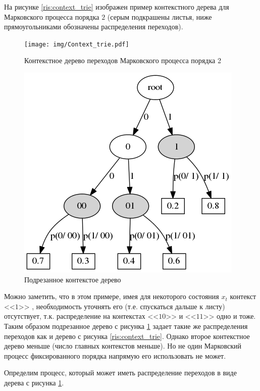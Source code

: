 \documentclass{matmex-diploma-custom}
\begin{document}
На рисунке \ref{ris:context_trie} изображен пример контекстного дерева для Марковского процесса порядка $ 2 $ (серым подкрашены листья, ниже прямоугольниками обозначены распределения переходов).
\begin{figure}[h!]\centering
\begin{minipage}[b]{0.49 \textwidth}
	\texttt{[image: img/Context\_trie.pdf]}
	\centering
	\caption{ Контекстное дерево переходов Марковского процесса порядка 2 }
	\label{ris:context_trie}
	
\end{minipage}
\hfil \hfil
\begin{minipage}[b]{0.49 \textwidth}
	\includegraphics[scale=0.4]{img/Prune_c_trie.png}
	\centering
	\caption{ Подрезанное контекстое дерево }
	\label{ris:prune_c_trie}
\end{minipage}
\end{figure}
Можно заметить, что в этом примере, имея для некоторого состояния $x_{t}$ контекст  <<$1$>> , необходимость уточнять его (т.е. спускаться дальше к листу) отсутствует, т.к. распределение на контекстах  <<$10$>>  и  <<$11$>>  одно и тоже. 
Таким образом подрезанное дерево с рисунка \ref{ris:prune_c_trie} задает такие же распределения переходов как и дерево с рисунка \ref{ris:context_trie}. 
Однако второе контекстное дерево меньше (число главных контекстов меньше).
Но не один Марковский процесс фиксированного порядка напрямую его использовать не может.

Определим процесс, который может иметь распределение переходов в виде дерева с рисунка \ref{ris:prune_c_trie}.
\end{document}
